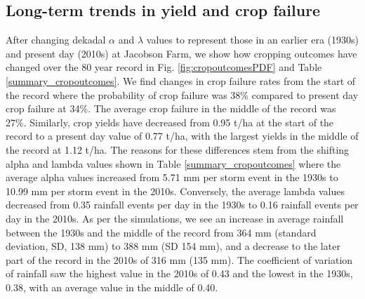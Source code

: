 \subsection{Long-term trends in yield and crop failure}

After changing dekadal $\alpha$ and $\lambda$ values to represent those in an earlier era (1930s) and present day (2010s) at Jacobson Farm, we show how cropping outcomes have changed over the 80 year record in Fig. \ref{fig:cropoutcomesPDF} and Table \ref{summary_cropoutcomes}. We find changes in crop failure rates from the start of the record where the probability of crop failure was 38\% compared to present day crop failure at 34\%. The average crop failure in the middle of the record was 27\%. Similarly, crop yields have decreased from 0.95 t/ha at the start of the record to a present day value of 0.77 t/ha, with the largest yields in the middle of the record at 1.12 t/ha. 
The reasons for these differences stem from the shifting alpha and lambda values shown in Table \ref{summary_cropoutcomes} where the average alpha values increased from 5.71 mm per storm event in the 1930s to 10.99 mm per storm event in the 2010s. Conversely, the average lambda values decreased from 0.35 rainfall events per day in the 1930s to 0.16 rainfall events per day in the 2010s. As per the simulations, we see an increase in average rainfall between the 1930s and the middle of the record from 364 mm (standard deviation, SD, 138 mm) to 388 mm (SD 154 mm), and a decrease to the later part of the record in the 2010s of 316 mm (135 mm). The coefficient of variation of rainfall saw the highest value in the 2010s of 0.43 and the lowest in the 1930s, 0.38, with an average value in the middle of 0.40. 
